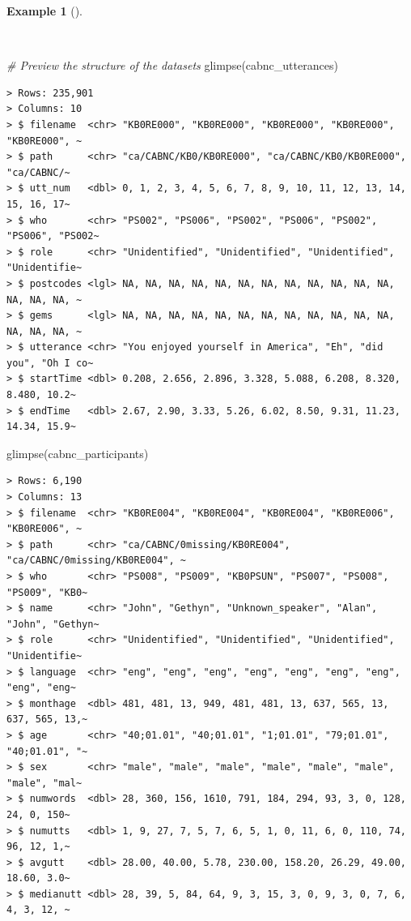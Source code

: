 \documentclass[
  letterpaper,
  DIV=11,
  numbers=noendperiod]{scrreprt}
\newenvironment{Shaded}{\begin{snugshade}}{\end{snugshade}}
\newcommand{\CommentTok}[1]{\textcolor[rgb]{0.00,0.00,0.00}{\textit{#1}}}
\newcommand{\FunctionTok}[1]{\textcolor[rgb]{0.00,0.00,0.00}{#1}}
\newcommand{\NormalTok}[1]{\textcolor[rgb]{0.00,0.00,0.00}{#1}}
\theoremstyle{definition}
\newtheorem{example}{Example}[chapter]
\theoremstyle{remark}
\begin{document}
\begin{example}[]\protect\hypertarget{exm-cd-cabnc-glimpse}{}\label{exm-cd-cabnc-glimpse}

~

\begin{Shaded}
\begin{Highlighting}[]
\CommentTok{\# Preview the structure of the datasets}
\FunctionTok{glimpse}\NormalTok{(cabnc\_utterances)}
\end{Highlighting}
\end{Shaded}

\begin{verbatim}
> Rows: 235,901
> Columns: 10
> $ filename  <chr> "KB0RE000", "KB0RE000", "KB0RE000", "KB0RE000", "KB0RE000", ~
> $ path      <chr> "ca/CABNC/KB0/KB0RE000", "ca/CABNC/KB0/KB0RE000", "ca/CABNC/~
> $ utt_num   <dbl> 0, 1, 2, 3, 4, 5, 6, 7, 8, 9, 10, 11, 12, 13, 14, 15, 16, 17~
> $ who       <chr> "PS002", "PS006", "PS002", "PS006", "PS002", "PS006", "PS002~
> $ role      <chr> "Unidentified", "Unidentified", "Unidentified", "Unidentifie~
> $ postcodes <lgl> NA, NA, NA, NA, NA, NA, NA, NA, NA, NA, NA, NA, NA, NA, NA, ~
> $ gems      <lgl> NA, NA, NA, NA, NA, NA, NA, NA, NA, NA, NA, NA, NA, NA, NA, ~
> $ utterance <chr> "You enjoyed yourself in America", "Eh", "did you", "Oh I co~
> $ startTime <dbl> 0.208, 2.656, 2.896, 3.328, 5.088, 6.208, 8.320, 8.480, 10.2~
> $ endTime   <dbl> 2.67, 2.90, 3.33, 5.26, 6.02, 8.50, 9.31, 11.23, 14.34, 15.9~
\end{verbatim}

\begin{Shaded}
\begin{Highlighting}[]
\FunctionTok{glimpse}\NormalTok{(cabnc\_participants)}
\end{Highlighting}
\end{Shaded}

\begin{verbatim}
> Rows: 6,190
> Columns: 13
> $ filename  <chr> "KB0RE004", "KB0RE004", "KB0RE004", "KB0RE006", "KB0RE006", ~
> $ path      <chr> "ca/CABNC/0missing/KB0RE004", "ca/CABNC/0missing/KB0RE004", ~
> $ who       <chr> "PS008", "PS009", "KB0PSUN", "PS007", "PS008", "PS009", "KB0~
> $ name      <chr> "John", "Gethyn", "Unknown_speaker", "Alan", "John", "Gethyn~
> $ role      <chr> "Unidentified", "Unidentified", "Unidentified", "Unidentifie~
> $ language  <chr> "eng", "eng", "eng", "eng", "eng", "eng", "eng", "eng", "eng~
> $ monthage  <dbl> 481, 481, 13, 949, 481, 481, 13, 637, 565, 13, 637, 565, 13,~
> $ age       <chr> "40;01.01", "40;01.01", "1;01.01", "79;01.01", "40;01.01", "~
> $ sex       <chr> "male", "male", "male", "male", "male", "male", "male", "mal~
> $ numwords  <dbl> 28, 360, 156, 1610, 791, 184, 294, 93, 3, 0, 128, 24, 0, 150~
> $ numutts   <dbl> 1, 9, 27, 7, 5, 7, 6, 5, 1, 0, 11, 6, 0, 110, 74, 96, 12, 1,~
> $ avgutt    <dbl> 28.00, 40.00, 5.78, 230.00, 158.20, 26.29, 49.00, 18.60, 3.0~
> $ medianutt <dbl> 28, 39, 5, 84, 64, 9, 3, 15, 3, 0, 9, 3, 0, 7, 6, 4, 3, 12, ~
\end{verbatim}

\end{example}
\end{document}
